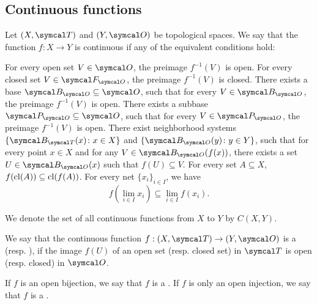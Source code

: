 \subsection{Continuous functions}\label{subsec:continuous_functions}

\begin{definition}\label{def:continuous_function}
  Let \( (X, \Cal{T}) \) and \( (Y, \Cal{O}) \) be topological spaces. We say that the function \( f: X \to Y \) is continuous if any of the equivalent conditions hold:
  \begin{defenum}
     For every open set \( V \in \Cal{O} \), the preimage \( f^{-1}(V) \) is open.
     For every closed set \( V \in \Cal{F}_{\Cal{O}} \), the preimage \( f^{-1}(V) \) is closed.
     There exists a base \( \Cal{B}_{\Cal{O}} \subseteq \Cal{O} \), such that for every \( V \in \Cal{B}_{\Cal{O}} \), the preimage \( f^{-1}(V) \) is open.
     There exists a subbase \( \Cal{P}_{\Cal{O}} \subseteq \Cal{O} \), such that for every \( V \in \Cal{P}_{\Cal{O}} \), the preimage \( f^{-1}(V) \) is open.
     There exist neighborhood systems \( \{ \Cal{B}_{\Cal{T}}(x) \colon x \in X \} \) and \( \{ \Cal{B}_{\Cal{O}}(y) \colon y \in Y \} \), such that for every point \( x \in X \) and for any \( V \in \Cal{B}_{\Cal{O}}(f(x)) \), there exists a set \( U \in \Cal{B}_{\Cal{O}}(x) \) such that \( f(U) \subseteq V \).
     For every set \( A \subseteq X \), \( f(\operatorname{cl}(A)) \subseteq \operatorname{cl}(f(A)) \).
     For every net \( \{ x_i \}_{i \in I} \), we have
    \begin{equation*}
      f\left(\lim_{i \in I} x_i \right) \subseteq \lim_{i \in I} f(x_i).
    \end{equation*}
  \end{defenum}

  We denote the set of all continuous functions from \( X \) to \( Y \) by \( C(X, Y) \).
\end{definition}

\begin{definition}\label{def:homeomorphism}
  We say that the continuous function \( f: (X, \Cal{T}) \to (Y, \Cal{O}) \) is a  (resp. ), if the image \( f(U) \) of an open set (resp. closed set) in \( \Cal{T} \) is open (resp. closed) in \( \Cal{O} \).

  If \( f \) is an open bijection, we say that \( f \) is a . If \( f \) is only an open injection, we say that \( f \) is a .
\end{definition}

